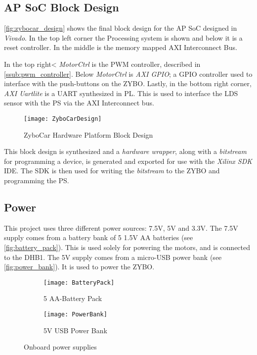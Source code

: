 \documentclass[Main]{subfiles}
\begin{document}
		

	\subsection{AP SoC Block Design} %
	\label{sub:ap_soc_block_design}

		\autoref{fig:zybocar_design} shows the final block design for the AP SoC designed in \emph{Vivado}.
		In the top left corner the Processing system is shown and below it is a reset controller. 
		In the middle is the memory mapped AXI Interconnect Bus.

		In the top right< \emph{MotorCtrl} is the PWM controller, described in \autoref{ssub:pwm_controller}.
		Below \emph{MotorCtrl} is \emph{AXI GPIO}; a GPIO controller used to interface with the push-buttons on the ZYBO.
		Lastly, in the bottom right corner, \emph{AXI Uartlite} is a UART synthesized in PL.
		This is used to interface the LDS sensor with the PS via the AXI Interconnect bus.

		\begin{figure}[H]
			\centering
			\texttt{[image: ZyboCarDesign]}
			\caption{ZyboCar Hardware Platform Block Design}
			\label{fig:zybocar_design}
		\end{figure}
		This block design is synthesized and a \emph{hardware wrapper}, along with a \emph{bitstream} for programming a device, is generated and exported for use with the \emph{Xilinx SDK} IDE.
		The SDK is then used for writing the \emph{bitstream} to the ZYBO and programming the PS. 


	\subsection{Power} %
	\label{sub:power}

		This project uses three different power sources: 7.5V, 5V and 3.3V.
		The 7.5V supply comes from a battery bank of 5 1.5V AA batteries (see \autoref{fig:battery_pack}).
		This is used solely for powering the motors, and is connected to the DHB1.
		The 5V supply comes from a micro-USB power bank (see \autoref{fig:power_bank}). 
		It is used to power the ZYBO.

		\begin{figure}[H]
			\centering
			\begin{subfigure}[t]{0.4\linewidth}
				\centering
				\texttt{[image: BatteryPack]}
				\caption{5 AA-Battery Pack}
				\label{fig:battery_pack}
			\end{subfigure}
			\quad
			\begin{subfigure}[t]{0.4\linewidth}
				\centering
				\texttt{[image: PowerBank]}
				\caption{5V USB Power Bank}
				\label{fig:power_bank}
			\end{subfigure}
			\caption{Onboard power supplies} 
		\end{figure}
\end{document}
